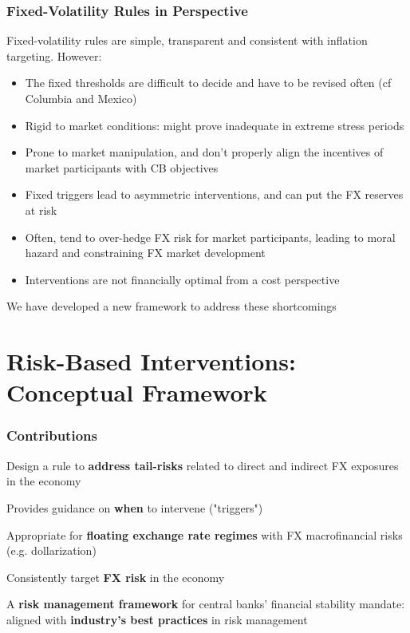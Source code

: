 \documentclass{beamer}
\newenvironment{largeitemize}{\itemize\addtolength{\itemsep}{10pt}}{\enditemize}
\begin{document}
\begin{frame}
  \frametitle{Fixed-Volatility Rules in Perspective}

  \small
  Fixed-volatility rules are simple, transparent and consistent with
  inflation targeting. However:
  
  \begin{itemize}
  \item The fixed thresholds are difficult to decide and have to be revised
    often (cf Columbia and Mexico)     
  \item Rigid to market conditions: might prove inadequate in extreme stress
    periods 
  \item Prone to market manipulation, and don't properly align the
    incentives of market participants with CB objectives 
  \item Fixed triggers lead to asymmetric interventions, and can put the FX
    reserves at risk
  \item Often, tend to over-hedge FX risk for market participants,
    leading to moral hazard and constraining FX market development
  \item Interventions are not financially optimal from a cost perspective
  \end{itemize}

We have developed a new framework to address these shortcomings

\normalsize

\end{frame}





\section{Risk-Based Interventions: Conceptual Framework}

\begin{frame}
  \frametitle{Contributions}
  \begin{largeitemize}
    \item Design a  rule to \textbf{address tail-risks} related  to direct and indirect
FX exposures in the economy
    \item Provides guidance on \textbf{when} to intervene ("triggers")
    \item Appropriate for \textbf{floating exchange rate regimes} with FX
      macrofinancial risks (e.g. dollarization)
    \item Consistently target \textbf{FX risk} in the economy
    \item A \textbf{risk management framework} for central banks' financial
      stability mandate: aligned with \textbf{industry's best practices} in risk management
  \end{largeitemize}  
\end{frame}
\end{document}
